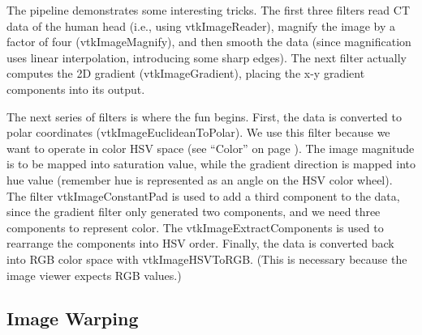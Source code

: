The pipeline demonstrates some interesting tricks. The first three filters read CT data of the human head (i.e., using vtkImageReader), magnify the image by a factor of four (vtkImageMagnify), and then smooth the data (since magnification uses linear interpolation, introducing some sharp edges). The next filter actually computes the 2D gradient (vtkImageGradient), placing the x-y gradient components into its output.

The next series of filters is where the fun begins. First, the data is converted to polar coordinates (vtkImageEuclideanToPolar). We use this filter because we want to operate in color HSV space (see ``Color'' on page \pageref{sec:color}). The image magnitude is to be mapped into saturation value, while the gradient direction is mapped into hue value (remember hue is represented as an angle on the HSV color wheel). The filter vtkImageConstantPad is used to add a third component to the data, since the gradient filter only generated two components, and we need three components to represent color. The vtkImageExtractComponents is used to rearrange the components into HSV order. Finally, the data is converted back into RGB color space with vtkImageHSVToRGB. (This is necessary because the image viewer expects RGB values.)

\subsection{Image Warping}

